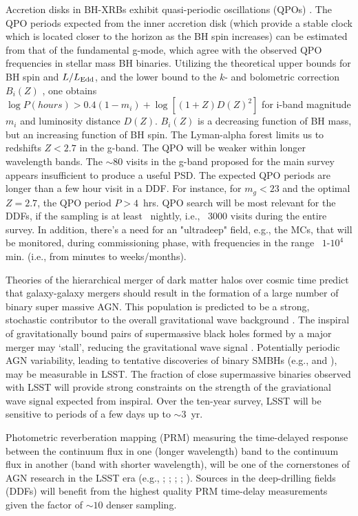 Accretion disks in BH-XRBs exhibit quasi-periodic oscillations (QPOs)
 \citep{BelloniAccretion}. The QPO periods expected
 from the inner accretion disk (which provide
 a stable clock which is located closer to the horizon as the BH spin
  increases) can be estimated from that of the fundamental g-mode, which agree
   with the observed QPO frequencies in stellar mass BH binaries. Utilizing the
    theoretical upper bounds for BH spin and $L/L_{\rm Edd}$, and the lower bound
     to the $k$- and bolometric correction $B_i(Z)$ , one obtains
 $\log P(hours) > 0.4(1-m_i) + \log[(1+Z)D(Z)^2]$
for i-band magnitude $m_i$ and luminosity distance $D(Z)$. $B_i(Z)$ is a decreasing 
function of BH mass, but an increasing function of BH spin. The Lyman-alpha forest
 limits us to redshifts $Z < 2.7$ in the g-band. The QPO 
will be weaker within longer wavelength bands. The $\sim 80$ visits in the g-band
 proposed for the main survey appears insufficient to produce a useful PSD. 
 The expected QPO periods are longer than a few hour visit in a DDF. For instance,
 for $m_g  <  23$ and the optimal $Z =  2.7$, the QPO period $P > 4$~hrs. QPO search
  will be most relevant for the DDFs, if the sampling is at least ~nightly, i.e., ~3000 visits
during the entire survey. In addition, there's a need for an "ultradeep" field, e.g., the MCs, that will
be monitored, during commissioning phase, with frequencies in the range ~$1$-$10^4$ min. (i.e., from
minutes to weeks/months).

Theories of the hierarchical merger of dark matter halos over cosmic 
time predict that galaxy-galaxy mergers should result in the formation
 of a large number of binary super massive AGN. This population is predicted
 to be a strong, stochastic contributor to the overall gravitational wave 
 background \citep{2015arXiv151105564T}. The inspiral of gravitationally
  bound pairs of supermassive black holes formed by a major merger may 
  `stall', reducing the gravitational wave signal \citep{2014SSRv..183..189C}. 
Potentially periodic AGN variability, leading to tentative discoveries
of binary SMBHs (e.g., \citet{2015Natur.525..351D} and
 \citet{2015MNRAS.453.1562G}), may be measurable in LSST. The fraction of 
 close supermassive binaries observed with LSST will provide strong 
 constraints on the strength of the graviational wave signal expected from
  inspiral. Over the ten-year survey, LSST will be sensitive to
periods of a few days up to $\sim3$~yr.

Photometric reverberation mapping (PRM) measuring the time-delayed
response between the continuum flux
in one (longer wavelength) band to the continuum flux in another (band
with shorter wavelength), will be one of the cornerstones of AGN
research in the LSST era (e.g., \citet{Chelouche2013};
\citet{CheloucheandZucker2013}; \citet{CheloucheEtal2014};
\citet{EdelsonEtal2015}; \citet{FausnaughEtal2015}). Sources in the
deep-drilling fields (DDFs) will benefit from the highest quality PRM
time-delay measurements given the factor of $\sim10$ denser sampling.

